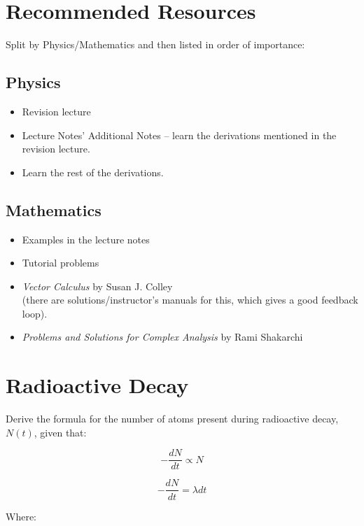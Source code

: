 \documentclass{article}
\begin{document}
\clearpage
\section{Recommended Resources}
Split by Physics/Mathematics and then listed in order of importance:
\subsection{Physics}
\begin{itemize}
  \item Revision lecture
  \item Lecture Notes' Additional Notes -- learn the derivations mentioned in
    the revision lecture. 
  \item Learn the rest of the derivations. 
\end{itemize}
\subsection{Mathematics}
\begin{itemize}
  \item Examples in the lecture notes
  \item Tutorial problems
  \item \textit{Vector Calculus} by Susan J. Colley \\
    (there are solutions/instructor's manuals for this, which gives a good 
    feedback loop).
  \item \textit{Problems and Solutions for Complex Analysis} by Rami Shakarchi
\end{itemize}

\clearpage
\section{Radioactive Decay}
Derive the formula for the number of atoms present during radioactive decay, 
$N(t)$, given that:

\begin{equation}
  - \frac{dN}{dt} \propto N
\end{equation}

\begin{equation}
  - \frac{dN}{dt} = \lambda dt
\end{equation}

Where:
\end{document}
